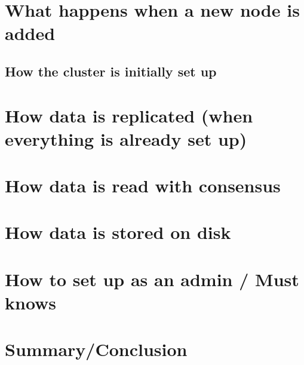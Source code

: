 \documentclass[10pt]{beamer}
\begin{document}
\section{What happens when a new node is added}  %
\subsection{How the cluster is initially set up}

\section{How data is replicated (when everything is already set up)}  %
\section{How data is read with consensus}  %
\section{How data is stored on disk}  %

\section{How to set up as an admin / Must knows}  %

\section{Summary/Conclusion}
\end{document}
